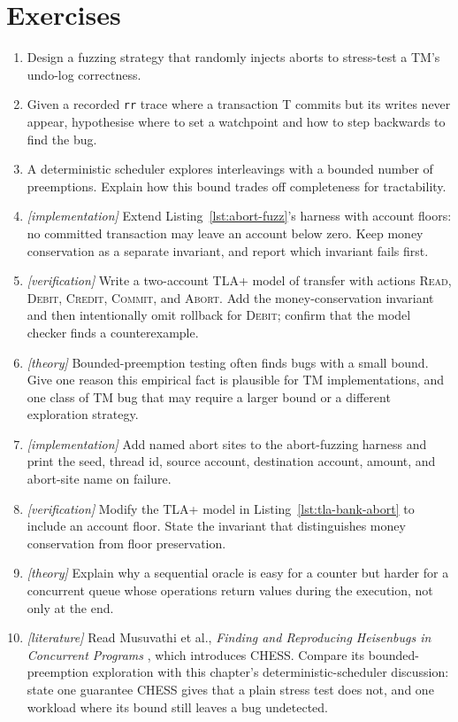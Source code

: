 \section{Exercises}
\begin{enumerate}
    \item Design a fuzzing strategy that randomly injects aborts to stress-test a TM's undo-log correctness.
    \item Given a recorded \texttt{rr} trace where a transaction T commits but its writes never appear, hypothesise where to set a watchpoint and how to step backwards to find the bug.
    \item A deterministic scheduler explores interleavings with a bounded number of preemptions. Explain how this bound trades off completeness for tractability.
    \item \emph{[implementation]} Extend Listing~\ref{lst:abort-fuzz}'s harness with account floors: no committed transaction may leave an account below zero. Keep money conservation as a separate invariant, and report which invariant fails first.
    \item \emph{[verification]} Write a two-account TLA+ model of transfer with actions \textsc{Read}, \textsc{Debit}, \textsc{Credit}, \textsc{Commit}, and \textsc{Abort}. Add the money-conservation invariant and then intentionally omit rollback for \textsc{Debit}; confirm that the model checker finds a counterexample.
    \item \emph{[theory]} Bounded-preemption testing often finds bugs with a small bound. Give one reason this empirical fact is plausible for TM implementations, and one class of TM bug that may require a larger bound or a different exploration strategy.
    \item \emph{[implementation]} Add named abort sites to the abort-fuzzing harness and print the seed, thread id, source account, destination account, amount, and abort-site name on failure.
    \item \emph{[verification]} Modify the TLA+ model in Listing~\ref{lst:tla-bank-abort} to include an account floor. State the invariant that distinguishes money conservation from floor preservation.
    \item \emph{[theory]} Explain why a sequential oracle is easy for a counter but harder for a concurrent queue whose operations return values during the execution, not only at the end.
    \item \emph{[literature]} Read Musuvathi et al., \emph{Finding and
          Reproducing Heisenbugs in Concurrent Programs}
          \cite{musuvathi08chess}, which introduces CHESS.  Compare its
          bounded-preemption exploration with this chapter's
          deterministic-scheduler discussion: state one guarantee CHESS
          gives that a plain stress test does not, and one workload where
          its bound still leaves a bug undetected.
\end{enumerate}


